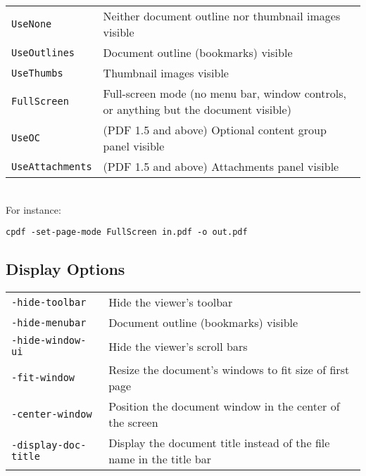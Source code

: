 \documentclass{book}
\begin{document}
\vspace{2mm}
  {\small\begin{tabular}{ll}
    \texttt{UseNone} & \vspace{2mm} \parbox{8cm}{Neither document outline nor thumbnail images visible} \\
    \texttt{UseOutlines} & \vspace{2mm} \parbox{8cm}{Document outline (bookmarks) visible} \\
    \texttt{UseThumbs} & \vspace{2mm} \parbox{8cm}{Thumbnail images visible} \\
    \texttt{FullScreen} & \vspace{2mm} \parbox{8cm}{Full-screen mode (no menu bar, window controls, or anything but the document visible)} \\
    \texttt{UseOC} & \vspace{2mm} \parbox{8cm}{(PDF 1.5 and above) Optional content group panel visible} \\
    \texttt{UseAttachments} & \vspace{2mm} \parbox{8cm}{(PDF 1.5 and above) Attachments panel visible}
  \end{tabular}}\\

  \noindent For instance:
  \begin{framed}
    \small\verb!cpdf -set-page-mode FullScreen in.pdf -o out.pdf!
  \end{framed}
  
  \subsection{Display Options}
\vspace{2mm}
  {\small\begin{tabular}{ll}
    \texttt{-hide-toolbar} & \vspace{2mm} \parbox{8cm}{Hide the viewer's toolbar} \\
    \texttt{-hide-menubar} & \vspace{2mm} \parbox{8cm}{Document outline (bookmarks) visible} \\
    \texttt{-hide-window-ui} & \vspace{2mm} \parbox{8cm}{Hide the viewer's scroll bars} \\
    \texttt{-fit-window} & \vspace{2mm} \parbox{8cm}{Resize the document's windows to fit size of first page} \\
    \texttt{-center-window} & \vspace{2mm} \parbox{8cm}{Position the document window in the center of the screen} \\
    \texttt{-display-doc-title} & \vspace{2mm} \parbox{8cm}{Display the document title instead of the file name in the title bar}
  \end{tabular}}\\
\end{document}
